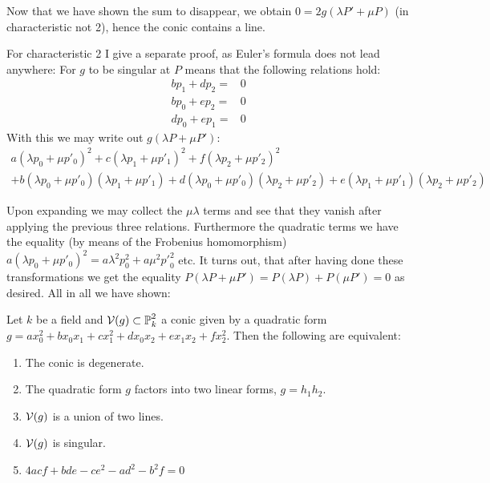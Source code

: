 Now that we have shown the sum to disappear, we obtain $0 = 2g(\lambda P' + \mu P)$ (in characteristic not 2), hence the conic contains a line.

For characteristic 2 I give a separate proof, as Euler's formula does not lead anywhere:
For $g$ to be singular at $P$ means that the following relations hold:
\begin{align}
bp_1 + dp_2 =& 0\\
bp_0 + ep_2 =& 0\\
dp_0 + ep_1 =& 0
\end{align}
With this we may write out $g(\lambda P + \mu P')$:
\begin{align}
a(\lambda p_0 + \mu p'_0)^2
+c(\lambda p_1 + \mu p'_1)^2
+f(\lambda p_2 + \mu p'_2)^2 \\
+b (\lambda p_0 + \mu p'_0)(\lambda p_1 + \mu p'_1)
+d (\lambda p_0 + \mu p'_0)(\lambda p_2 + \mu p'_2)
+e (\lambda p_1 + \mu p'_1)(\lambda p_2 + \mu p'_2)
\end{align}

Upon expanding we may collect the $\mu\lambda$ terms and see that they vanish after applying the previous three relations.
Furthermore the quadratic terms we have the equality (by means of the Frobenius homomorphism)
$a(\lambda p_0 + \mu p'_0)^2 = a\lambda^2p_0^2 + a \mu^2 {p'}_0^2$ etc.
It turns out, that after having done these transformations we get the equality $P(\lambda P + \mu P') = P(\lambda P) + P(\mu P') = 0$ as desired.
All in all we have shown:

\begin{theorem}
Let $k$ be a field and $\operatorname{\mathcal V}(g) \subset \operatorname{\mathbb P}^2_k$ a conic given by a quadratic form $g = ax_0^2 + bx_0x_1 + cx_1^2 + dx_0x_2 + ex_1x_2 + fx_2^2$.
Then the following are equivalent:
\begin{enumerate}
\item The conic is degenerate.
\item The quadratic form $g$ factors into two linear forms, $g=h_1h_2$.
\item $\operatorname{\mathcal V}(g)$ is a union of two lines.
\item $\operatorname{\mathcal V}(g)$ is singular.
\item $4acf + bde - ce^2 - ad^2 - b^2f = 0$
\end{enumerate}
\end{theorem}






